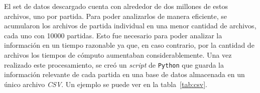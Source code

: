 \documentclass[11pt,twoside, spanish]{report} %
\begin{document}
El set de datos descargado cuenta con alrededor de dos millones de estos archivos, uno por partida.
Para poder analizarlos de manera eficiente, se acumularon los archivos de partida individual en una menor cantidad de archivos, cada uno con \num{10000} partidas.
Esto fue necesario para poder analizar la informaci\'on en un tiempo razonable ya que, en caso contrario, por la cantidad de archivos los tiempos de c\'omputo aumentaban considerablemente.
Una vez realizado este procesamiento, se cre\'o un \textit{script} de \texttt{Python} que guarda la informaci\'on relevante de cada partida en una base de datos almacenada en un \'unico archivo \textit{CSV}.
Un ejemplo se puede ver en la tabla~\ref{tab:csv}.

\begin{table}[H]
	\centering
	\caption{Ejemplo de informaci\'on de partidas obtenidas desde el servicio en l\'inea KGS.}
	\label{tab:csv}
\end{table}
\end{document}
